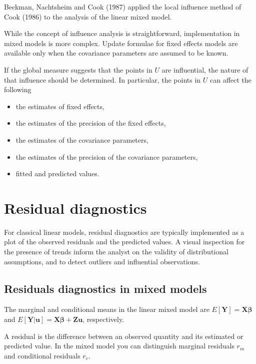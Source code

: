 \documentclass[12pt, a4paper]{report}
\theoremstyle{plain}
\theoremstyle{definition}
\theoremstyle{remark}
\begin{document}
Beckman, Nachtsheim and Cook (1987) \citet{Beckman} applied the local influence method of Cook (1986) to the analysis of the linear mixed model.

While the concept of influence analysis is straightforward, implementation in mixed models is more complex. Update formulae for fixed effects models are available only when the covariance parameters are assumed to be known.

If the global measure suggests that the points in $U$ are influential, the nature of that influence should be determined. In particular, the points in $U$ can affect the following

\begin{itemize}
\item the estimates of fixed effects,
\item the estimates of the precision of the fixed effects,
\item the estimates of the covariance parameters,
\item the estimates of the precision of the covariance parameters,
\item fitted and predicted values.
\end{itemize}


\newpage
\section{Residual diagnostics} %
For classical linear models, residual diagnostics are typically implemented as a plot of the observed residuals and the predicted values. A visual inspection for the presence of trends inform the analyst on the validity of distributional assumptions, and to detect outliers and influential observations.



	
\subsection{Residuals diagnostics in mixed models}

The marginal and conditional means in the linear mixed model are
$E[\boldsymbol{Y}] = \boldsymbol{X}\boldsymbol{\beta}$ and
$E[\boldsymbol{Y|\boldsymbol{u}}] = \boldsymbol{X}\boldsymbol{\beta} + \boldsymbol{Z}\boldsymbol{u}$, respectively.

A residual is the difference between an observed quantity and its estimated or predicted value. In the mixed
model you can distinguish marginal residuals $r_m$ and conditional residuals $r_c$. 
\end{document}
